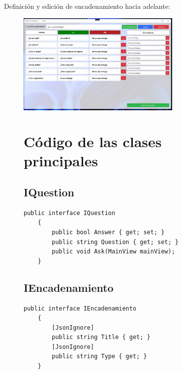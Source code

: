 \documentclass[conference]{IEEEtran}
\begin{document}
Definición y edición de encadenamiento hacia adelante:
\begin{figure}[h!]
    \includegraphics[width=8cm]{hacia_adelante.jpg}
\end{figure}
\newpage

\begin{figure}[t]
    \section{Código de las clases principales}
\subsection{IQuestion}    
\begin{lstlisting}[language={[Sharp]C}, title={IQuestion}]
    public interface IQuestion
    {
        public bool Answer { get; set; }
        public string Question { get; set; }
        public void Ask(MainView mainView);
    }
\end{lstlisting}
\end{figure}
\newpage

\begin{figure}[t]
\subsection{IEncadenamiento}   
\begin{lstlisting}[language={[Sharp]C}, title={IEncadenamiento}]
    public interface IEncadenamiento
    {
        [JsonIgnore]
        public string Title { get; }
        [JsonIgnore]
        public string Type { get; }
    }
\end{lstlisting}
\end{figure}
\end{document}
